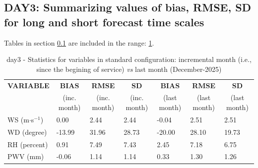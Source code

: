 \subsection{DAY3: Summarizing values of bias, RMSE, SD for long and short forecast time scales}\label{subsec:day3:stat}
Tables in section \ref{subsec:day3:stat} are included in the range: \ref{tab:day3:statBEF}.
\begin{table}[h!]
\begin{center}
\begin{tabular}{|l|l|l|l|l|l|l|}
\hline
\multicolumn{1}{|c|}{\cellcolor[HTML]{C0C0C0}\textbf{VARIABLE}} & \multicolumn{1}{c|}{\cellcolor[HTML]{C0C0C0}\textbf{BIAS}} & \multicolumn{1}{c|}{\cellcolor[HTML]{C0C0C0}\textbf{RMSE}} & \multicolumn{1}{c|}{\cellcolor[HTML]{C0C0C0}\textbf{SD}} & \multicolumn{1}{c|}{\cellcolor[HTML]{C0C0C0}\textbf{BIAS}} & \multicolumn{1}{c|}{\cellcolor[HTML]{C0C0C0}\textbf{RMSE}} & \multicolumn{1}{c|}{\cellcolor[HTML]{C0C0C0}\textbf{SD}}\\
\multicolumn{1}{|c|}{\cellcolor[HTML]{C0C0C0}} & \multicolumn{1}{c|}{\cellcolor[HTML]{C0C0C0}(inc. month)} & \multicolumn{1}{c|}{\cellcolor[HTML]{C0C0C0}(inc. month)} & \multicolumn{1}{c|}{\cellcolor[HTML]{C0C0C0}(inc. month)} & \multicolumn{1}{c|}{\cellcolor[HTML]{C0C0C0}(last month)} & \multicolumn{1}{c|}{\cellcolor[HTML]{C0C0C0}(last month)} & \multicolumn{1}{c|}{\cellcolor[HTML]{C0C0C0}(last month)}\\\hline
\cellcolor[HTML]{C0C0C0}WS (m$\cdot$s$^{-1}$) &      0.00  &      2.44  &      2.44  &     -0.04     &      2.51     &      2.51\\
\cellcolor[HTML]{C0C0C0}WD (degree)           &    -13.99  &     31.96  &     28.73  &    -20.00     &     28.10     &     19.73\\
\cellcolor[HTML]{C0C0C0}RH (percent)          &      0.91  &      7.49  &      7.43  &      2.45     &      7.18     &      6.75\\
\cellcolor[HTML]{C0C0C0}PWV (mm)              &     -0.06 &      1.14 &      1.14 &      0.33    &      1.30    &      1.26\\
\hline
\end{tabular}
\caption{day3 - Statistics for variables in standard configuration: incremental month (i.e., since the begining of service) \textit{vs} last month (December-2025)}\label{tab:day3:statBEF}
\end{center}
\end{table}

